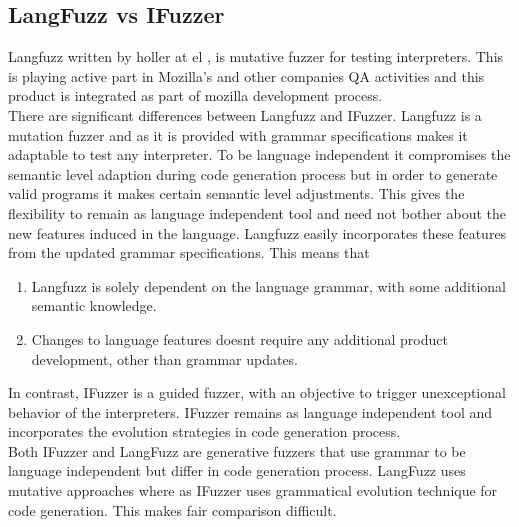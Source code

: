\documentclass{acm_proc_article-sp}
\begin{document}
\subsection{LangFuzz vs IFuzzer}
Langfuzz written by holler at el \cite{Holler11}, is mutative fuzzer for testing interpreters. This is playing active part in Mozilla's and other companies QA activities and this product is integrated as part of mozilla development process.\\
\indent There are significant differences between Langfuzz and IFuzzer. Langfuzz is a mutation fuzzer and as it is provided with grammar specifications makes it adaptable to test any interpreter. To be language independent it compromises the semantic level adaption during code generation process but in order to generate valid programs it makes certain semantic level adjustments. This gives the flexibility to remain as language independent tool and need not bother about the new features induced in the language. Langfuzz easily incorporates these features from the updated grammar specifications. This means that

\begin{enumerate}
\item Langfuzz is solely dependent on the language grammar, with some additional semantic knowledge.
\item Changes to language features doesnt require any additional product development, other than grammar updates.
\end{enumerate}

\indent In contrast, IFuzzer is a guided fuzzer, with an objective to trigger unexceptional behavior of the interpreters. IFuzzer remains as language independent tool and incorporates the evolution strategies in code generation process. \\
\indent Both IFuzzer and LangFuzz are generative fuzzers that use grammar to be language independent but differ in code generation process. LangFuzz uses mutative approaches where as IFuzzer uses grammatical evolution technique for code generation. This makes fair comparison difficult. 
\end{document}
